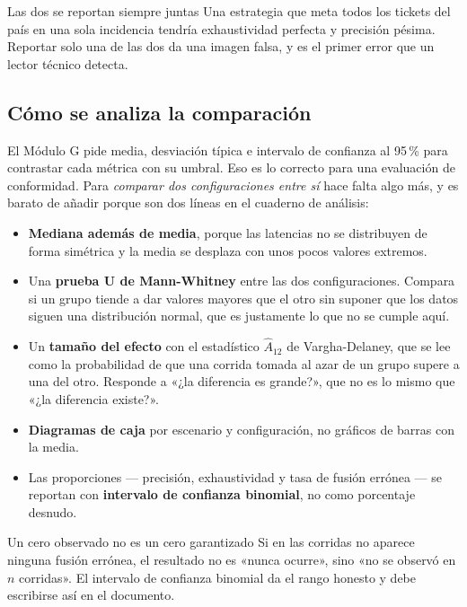 \documentclass[11pt,a4paper]{article}
\begin{document}
\begin{avisoBox}{Las dos se reportan siempre juntas}
	Una estrategia que meta todos los tickets del país en una sola incidencia tendría exhaustividad perfecta y precisión pésima. Reportar solo una de las dos da una imagen falsa, y es el primer error que un lector técnico detecta.
\end{avisoBox}

\subsection{Cómo se analiza la comparación}

El Módulo G pide media, desviación típica e intervalo de confianza al 95\,\% para contrastar cada métrica con su umbral. Eso es lo correcto para una evaluación de conformidad. Para \emph{comparar dos configuraciones entre sí} hace falta algo más, y es barato de añadir porque son dos líneas en el cuaderno de análisis:

\begin{itemize}[leftmargin=*,itemsep=4pt]
	\item \textbf{Mediana además de media}, porque las latencias no se distribuyen de forma simétrica y la media se desplaza con unos pocos valores extremos.
	\item Una \textbf{prueba U de Mann-Whitney} entre las dos configuraciones. Compara si un grupo tiende a dar valores mayores que el otro sin suponer que los datos siguen una distribución normal, que es justamente lo que no se cumple aquí.
	\item Un \textbf{tamaño del efecto} con el estadístico $\hat{A}_{12}$ de Vargha-Delaney, que se lee como la probabilidad de que una corrida tomada al azar de un grupo supere a una del otro. Responde a «¿la diferencia es grande?», que no es lo mismo que «¿la diferencia existe?».
	\item \textbf{Diagramas de caja} por escenario y configuración, no gráficos de barras con la media.
	\item Las proporciones --- precisión, exhaustividad y tasa de fusión errónea --- se reportan con \textbf{intervalo de confianza binomial}, no como porcentaje desnudo.
\end{itemize}

\begin{avisoBox}{Un cero observado no es un cero garantizado}
	Si en las corridas no aparece ninguna fusión errónea, el resultado no es «nunca ocurre», sino «no se observó en $n$ corridas». El intervalo de confianza binomial da el rango honesto y debe escribirse así en el documento.
\end{avisoBox}
\end{document}
